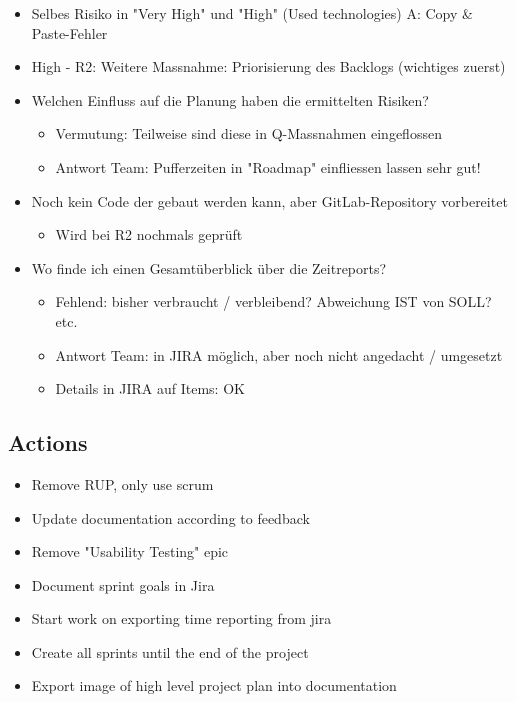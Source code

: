 \begin{itemize}
\begin{itemize}
    \end{itemize}
    \item Selbes Risiko in "Very High" und "High" (Used technologies) \textrightarrow A: Copy \& Paste-Fehler
    \item High - R2: Weitere Massnahme: Priorisierung des Backlogs (wichtiges zuerst)
    \item Welchen Einfluss auf die Planung haben die ermittelten Risiken?
    \begin{itemize}
        \item Vermutung: Teilweise sind diese in Q-Massnahmen eingeflossen
        \item Antwort Team: Pufferzeiten in "Roadmap" einfliessen lassen \textrightarrow sehr gut!
    \end{itemize}
    \item Noch kein Code der gebaut werden kann, aber GitLab-Repository vorbereitet
    \begin{itemize}
        \item Wird bei R2 nochmals geprüft
    \end{itemize}
    \item Wo finde ich einen Gesamtüberblick über die Zeitreports?
    \begin{itemize}
        \item Fehlend: bisher verbraucht / verbleibend? Abweichung IST von SOLL? etc.
        \item Antwort Team: in JIRA möglich, aber noch nicht angedacht / umgesetzt
        \item Details in JIRA auf Items: OK
    \end{itemize}
\end{itemize}

\subsection{Actions}

\begin{itemize}
    \item Remove RUP, only use scrum
    \item Update documentation according to feedback
    \item Remove "Usability Testing" epic
    \item Document sprint goals in Jira
    \item Start work on exporting time reporting from jira
    \item Create all sprints until the end of the project
    \item Export image of high level project plan into documentation
\end{itemize}

